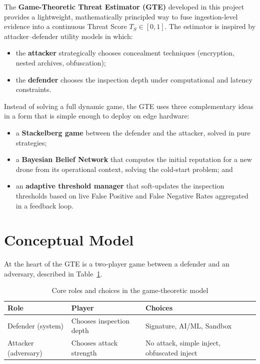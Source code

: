 \documentclass[12pt, a4paper]{report}
\begin{document}
The \textbf{Game-Theoretic Threat Estimator (GTE)} developed in this
project provides a lightweight, mathematically principled way to fuse
ingestion-level evidence into a continuous Threat Score
$T_S \in [0,1]$. The estimator is inspired by attacker--defender utility
models in which:
\begin{itemize}
    \item the \textbf{attacker} strategically chooses concealment
          techniques (encryption, nested archives, obfuscation);
    \item the \textbf{defender} chooses the inspection depth under
          computational and latency constraints.
\end{itemize}

Instead of solving a full dynamic game, the GTE uses three
complementary ideas in a form that is simple enough to deploy on edge
hardware:
\begin{itemize}
    \item a \textbf{Stackelberg game} between the defender and the
          attacker, solved in pure strategies;
    \item a \textbf{Bayesian Belief Network} that computes the initial
          reputation for a new drone from its operational context,
          solving the cold-start problem; and
    \item an \textbf{adaptive threshold manager} that soft-updates the
          inspection thresholds based on live False Positive and False
          Negative Rates aggregated in a feedback loop.
\end{itemize}

\section{Conceptual Model}

At the heart of the GTE is a two-player game between a defender and an
adversary, described in Table~\ref{tab:gte-core-roles}.

\begin{table}[H]
\centering
\caption{Core roles and choices in the game-theoretic model}
\label{tab:gte-core-roles}
\begin{tabular}{|l|l|p{6cm}|}
\hline
\textbf{Role} & \textbf{Player} & \textbf{Choices} \\
\hline
Defender (system) & Chooses inspection depth & Signature, AI/ML, Sandbox \\
\hline
Attacker (adversary) & Chooses attack strength & No attack, simple inject, obfuscated inject \\
\hline
\end{tabular}
\end{table}
\end{document}
